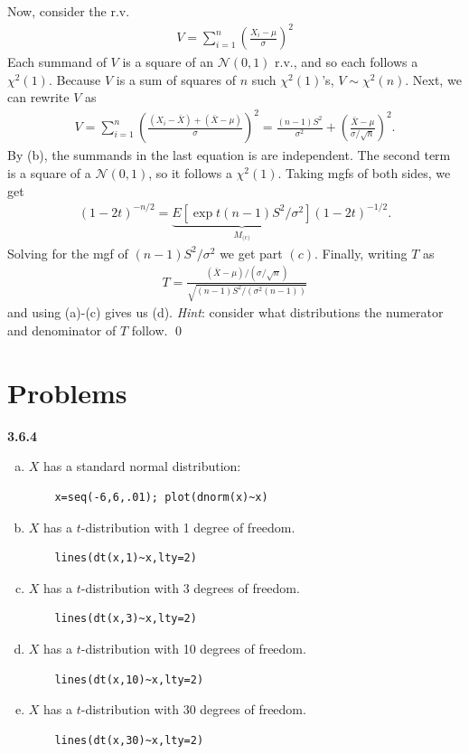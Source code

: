 \documentclass{book}
\theoremstyle{definition}
\newcommand{\N}{\mathcal{N}}
\newcommand{\f}[2]{\frac{#1}{#2}}
\newcommand{\lp}{\left(}
\newcommand{\rp}{\right)}
\begin{document}
Now, consider the r.v. 
\begin{align}
V = \sum^n_{i=1} \lp\f{X_i - \mu}{\sigma}\rp^2
\end{align} 
Each summand of $V$ is a square of an $\N(0,1)$ r.v., and so each follows a $\chi^2(1)$. Because $V$ is a sum of squares of $n$ such $\chi^2(1)$'s, $V \sim\chi^2(n)$. Next, we can rewrite $V$ as
\begin{align}
V = \sum^n_{i=1}\lp \f{(X_i - \bar{X}) + (\bar{X} - \mu)}{\sigma} \rp^2 = \f{(n-1)S^2}{\sigma^2} + \lp \f{\bar{X} - \mu}{\sigma/\sqrt{n}} \rp^2.
\end{align}
By (b), the summands in the last equation is are independent. The second term is a square of a $\N(0,1)$, so it follows a $\chi^2(1)$. Taking mgfs of both sides, we get
\begin{align}
(1-2t)^{-n/2} = \underbrace{E[\exp{t(n-1)S^2/\sigma^2}]}_{M_{\text{(c)}}} (1-2t)^{-1/2}.
\end{align}
Solving for the mgf of $(n-1)S^2/\sigma^2$ we get part $(c)$. Finally, writing $T$ as
\begin{align}
T = \f{(\bar{X} - \mu)/(\sigma/\sqrt{n})}{\sqrt{(n-1)S^2/(\sigma^2(n-1))}}
\end{align}
and using (a)-(c) gives us (d). \textit{Hint}: consider what distributions the numerator and denominator of $T$ follow. \qed









\newpage
 
\section{Problems}

\noindent \textbf{3.6.4}
\begin{enumerate}[(a)]
	\item $X$ has a standard normal distribution:
	\begin{lstlisting}
	x=seq(-6,6,.01); plot(dnorm(x)~x)
	\end{lstlisting}
	\item $X$ has a $t$-distribution with 1 degree of freedom.
	\begin{lstlisting}
	lines(dt(x,1)~x,lty=2)
	\end{lstlisting}
	\item $X$ has a $t$-distribution with 3 degrees of freedom.
	\begin{lstlisting}
	lines(dt(x,3)~x,lty=2)
	\end{lstlisting}
	\item $X$ has a $t$-distribution with 10 degrees of freedom.
	\begin{lstlisting}
	lines(dt(x,10)~x,lty=2)
	\end{lstlisting}
	\item $X$ has a $t$-distribution with 30 degrees of freedom.
	\begin{lstlisting}
	lines(dt(x,30)~x,lty=2)
	\end{lstlisting}
\end{enumerate}
\end{document}
